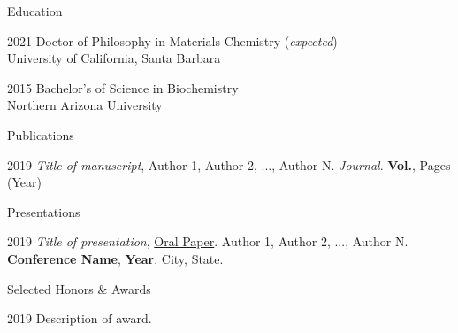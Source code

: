 
\begin{vitae}

    \begin{vitaesection}{Education}
        \item [2021] Doctor of Philosophy in Materials Chemistry (\textit{expected})\\
            University of California, Santa Barbara\\
        \item [2015] Bachelor's of Science in Biochemistry\\
            Northern Arizona University
    \end{vitaesection}
    
    \begin{vitaesection}{Publications}
        \item [2019] 
            \textit{Title of manuscript}, 
            Author 1, Author 2, ..., Author N. 
            \textit{Journal}.
            \textbf{Vol.},
            Pages
            (Year)
    \end{vitaesection}
    
    \begin{vitaesection}{Presentations}
        \item [2019] 
            \textit{Title of presentation},
            \underline{Oral Paper}.
            Author 1, Author 2, ..., Author N. 
            \textbf{Conference Name},
            \textbf{Year}.
            City, State.
    \end{vitaesection}
    
    \begin{vitaesection}{Selected Honors \& Awards}
        \item [2019] Description of award.
    \end{vitaesection}

\end{vitae}